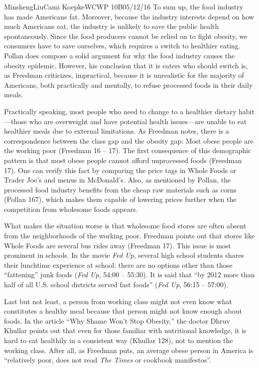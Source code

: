 \documentclass[12pt,letterpaper]{article}
\begin{document}
\begin{mla}{Minsheng}{Liu}{Cami Koepke}{WCWP 10B}{05/12/16}
To sum up, the food industry has made Americans fat. Moreover, because
the industry interests depend on how much Americans eat, the industry is
unlikely to save the public health spontaneously. Since the food
producers cannot be relied on to fight obesity, we consumers have to
save ourselves, which requires a switch to healthier eating. Pollan does
compose a solid argument for why the food industry causes the obesity
epidemic. However, his conclusion that it is eaters who should switch
is, as Freedman criticizes, impractical, because it is unrealistic for
the majority of Americans, both practically and mentally, to refuse
processed foods in their daily meals.

Practically speaking, most people who need to change to a healthier
dietary habit---those who are overweight and have potential health
issues---are unable to eat healthier meals due to external limitations.
As Freedman notes, there is a correspondence between the class gap and
the obesity gap: Most obese people are the working poor (Freedman 16 --
17). The first consequence of this demographic pattern is that most
obese people cannot afford unprocessed foods (Freedman 17). One can
verify this fact by comparing the price tags in Whole Foods or Trader
Joe's and menus in McDonald's. Also, as mentioned by Pollan, the
processed food industry benefits from the cheap raw materials such as
corns (Pollan 167), which makes them capable of lowering prices further
when the competition from wholesome foods appears.

What makes the situation worse is that wholesome food stores are often
absent from the neighborhoods of the working poor. Freedman points out
that stores like Whole Foods are several bus rides away (Freedman 17).
This issue is most prominent in schools. In the movie \emph{Fed Up},
several high school students shares their lunchtime experience at
school: there are no options other than those ``fattening'' junk foods
(\emph{Fed Up}, 54:00 -- 55:30). It is said that ``by 2012 more than
half of all U.S. school districts served fast foods'' (\emph{Fed Up},
56:15 -- 57:00).

Last but not least, a person from working class might not even know what
constitutes a healthy meal because that person might not know enough
about foods. In the article ``Why Shame Won't Stop Obesity,'' the doctor
Dhruv Khullar points out that even for those familiar with nutritional
knowledge, it is hard to eat healthily in a consistent way (Khullar
128), not to mention the working class. After all, as Freedman puts, an
average obese person in America is ``relatively poor, does not read
\emph{The Times} or cookbook manifestos''.


\end{mla}
\end{document}
